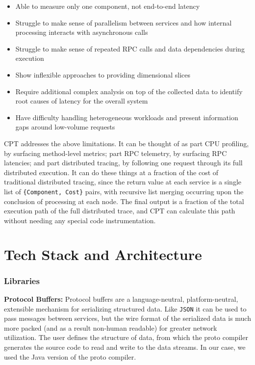 \documentclass[11pt, twoside, twocolumn]{extarticle}
\begin{document}
\begin{itemize}
    \item Able to measure only one component, not end-to-end latency
    \item Struggle to make sense of parallelism between services and how internal processing interacts with asynchronous calls
    \item Struggle to make sense of repeated RPC calls and data dependencies during execution
    \item Show inflexible approaches to providing dimensional slices
    \item Require additional complex analysis on top of the collected data to identify root causes of latency for the overall system
    \item Have difficulty handling heterogeneous workloads and present information gaps around low-volume requests
\end{itemize}

CPT addresses the above limitations.  It can be thought of as part CPU profiling, by surfacing method-level metrics; part RPC telemetry, by surfacing RPC latencies; and part distributed tracing, by following one request through its full distributed execution. It can do these things at a fraction of the cost of traditional distributed tracing, since the return value at each service is a single list of \lstinline|{Component, Cost}| pairs, with recursive list merging occurring upon the conclusion of processing at each node.  The final output is a fraction of the total execution path of the full distributed trace, and CPT can calculate this path without needing any special code instrumentation.

\section{Tech Stack and Architecture}

\subsubsection*{Libraries}

\textbf{Protocol Buffers:} Protocol buffers\cite{protobuff} are a language-neutral, platform-neutral, extensible mechanism for serializing structured data. Like \lstinline{JSON} it can be used to pass messages between services, but the wire format of the serialized data is much more packed (and as a result non-human readable) for greater network utilization. The user defines the structure of data, from which the proto compiler generates the source code to read and write to the data streams.  In our case, we used the Java version of the proto compiler.
\end{document}
